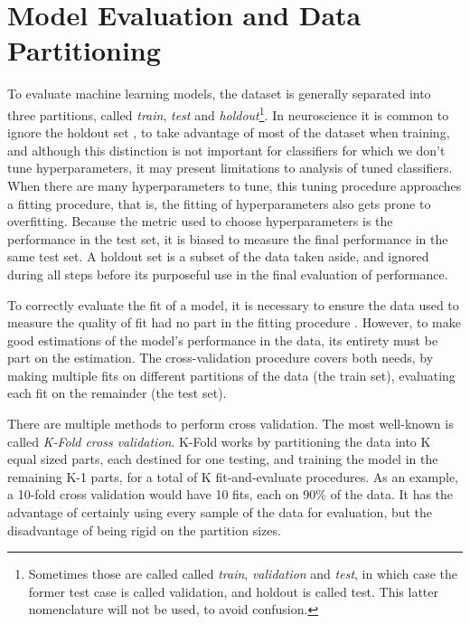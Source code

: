 \section*{Model Evaluation and Data Partitioning}
    
    To evaluate machine learning models, the dataset is generally separated into three partitions, called \textit{train}, \textit{test} and \textit{holdout}\footnote{Sometimes those are called called \textit{train}, \textit{validation} and \textit{test}, in which case the former test case is called validation, and holdout is called test. This latter nomenclature will not be used, to avoid confusion.}\cite{kohavi1995study}. In neuroscience it is common to ignore the holdout set \cite{bakhurin2017differential}, to take advantage of most of the dataset when training, and although this distinction is not important for classifiers for which we don't tune hyperparameters, it may present limitations to analysis of tuned classifiers. When there are many hyperparameters to tune, this tuning procedure approaches a fitting procedure, that is, the fitting of hyperparameters also gets prone to overfitting. Because the metric used to choose hyperparameters is the performance in the test set, it is biased to measure the final performance in the same test set. A holdout set is a subset of the data taken aside, and ignored during all steps before its purposeful use in the final evaluation of performance.
    
    To correctly evaluate the fit of a model, it is necessary to ensure the data used to measure the quality of fit had no part in the fitting procedure \cite{murphy2012machine, kohavi1995study}. However, to make good estimations of the model's performance in the data, its entirety must be part on the estimation. The cross-validation procedure covers both needs, by making multiple fits on different partitions of the data (the train set), evaluating each fit on the remainder (the test set).
    
    There are multiple methods to perform cross validation. The most well-known is called \textit{K-Fold cross validation}. K-Fold works by partitioning the data into K equal sized parts, each destined for one testing, and training the model in the remaining K-1 parts, for a total of K fit-and-evaluate procedures. As an example, a 10-fold cross validation would have 10 fits, each on 90\% of the data. It has the advantage of certainly using every sample of the data for evaluation, but the disadvantage of being rigid on the partition sizes. 
    
